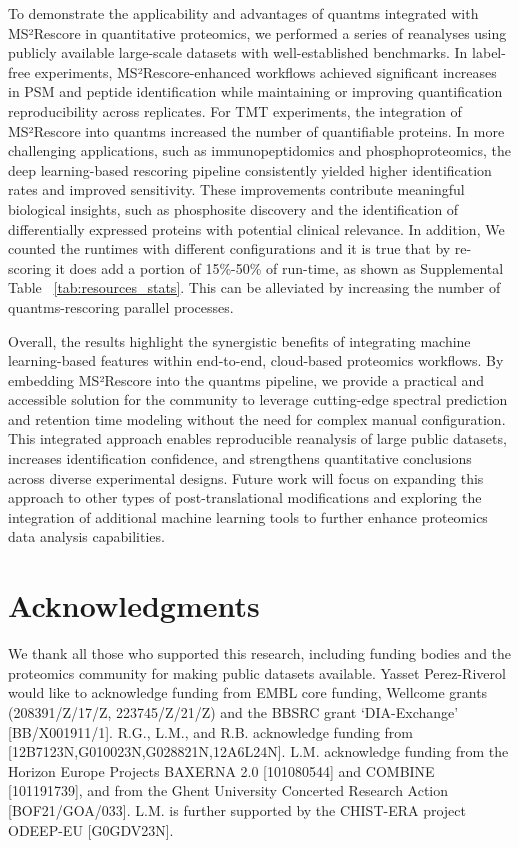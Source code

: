 \documentclass[12pt]{article}
\begin{document}
To demonstrate the applicability and advantages of quantms integrated with MS²Rescore in quantitative proteomics, we performed a series of reanalyses using publicly available large-scale datasets with well-established benchmarks. In label-free experiments, MS²Rescore-enhanced workflows achieved significant increases in PSM and peptide identification while maintaining or improving quantification reproducibility across replicates. For TMT experiments, the integration of MS²Rescore into quantms increased the number of quantifiable proteins. In more challenging applications, such as immunopeptidomics and phosphoproteomics, the deep learning-based rescoring pipeline consistently yielded higher identification rates and improved sensitivity. These improvements contribute meaningful biological insights, such as phosphosite discovery and the identification of differentially expressed proteins with potential clinical relevance. In addition, We counted the runtimes with different configurations and it is true that by re-scoring it does add a portion of 15\%-50\% of run-time, as shown as Supplemental Table ~\ref{tab:resources_stats}. This can be alleviated by increasing the number of quantms-rescoring parallel processes. %

Overall, the results highlight the synergistic benefits of integrating machine learning-based features within end-to-end, cloud-based proteomics workflows. By embedding MS²Rescore into the quantms pipeline, we provide a practical and accessible solution for the community to leverage cutting-edge spectral prediction and retention time modeling without the need for complex manual configuration. This integrated approach enables reproducible reanalysis of large public datasets, increases identification confidence, and strengthens quantitative conclusions across diverse experimental designs. Future work will focus on expanding this approach to other types of post-translational modifications and exploring the integration of additional machine learning tools to further enhance proteomics data analysis capabilities. %

\section*{Acknowledgments}
We thank all those who supported this research, including funding bodies and the proteomics community for making public datasets available. 
Yasset Perez-Riverol would like to acknowledge funding from EMBL core funding, Wellcome grants (208391/Z/17/Z, 223745/Z/21/Z) and the BBSRC grant ‘DIA-Exchange’ [BB/X001911/1].
R.G., L.M., and R.B. acknowledge funding from [12B7123N,G010023N,G028821N,12A6L24N]. L.M. acknowledge funding from the Horizon Europe Projects BAXERNA 2.0 [101080544] and COMBINE [101191739], and from the Ghent University Concerted Research Action [BOF21/GOA/033]. L.M. is further supported by the CHIST-ERA project ODEEP-EU [G0GDV23N].
\end{document}
